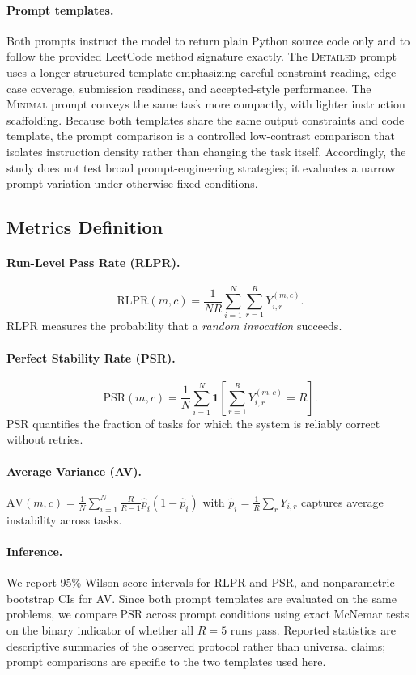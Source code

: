 \documentclass{article}
\begin{document}
\paragraph{Prompt templates.} Both prompts instruct the model to return plain Python source code only and to follow the provided LeetCode method signature exactly. The \textsc{Detailed} prompt uses a longer structured template emphasizing careful constraint reading, edge-case coverage, submission readiness, and accepted-style performance. The \textsc{Minimal} prompt conveys the same task more compactly, with lighter instruction scaffolding. Because both templates share the same output constraints and code template, the prompt comparison is a controlled low-contrast comparison that isolates instruction density rather than changing the task itself. Accordingly, the study does not test broad prompt-engineering strategies; it evaluates a narrow prompt variation under otherwise fixed conditions.

\subsection{Metrics Definition}
\label{sec:metrics}

\paragraph{Run-Level Pass Rate (RLPR).}
$$
\mathrm{RLPR}(m,c)=\frac{1}{NR}\sum_{i=1}^{N}\sum_{r=1}^{R} Y_{i,r}^{(m,c)}.
$$
RLPR measures the probability that a \emph{random invocation} succeeds.

\paragraph{Perfect Stability Rate (PSR).}
$$
\mathrm{PSR}(m,c)=\frac{1}{N}\sum_{i=1}^{N} \mathbf{1}\!\left[\sum_{r=1}^{R} Y_{i,r}^{(m,c)}=R\right].
$$
PSR quantifies the fraction of tasks for which the system is reliably correct without retries.

\paragraph{Average Variance (AV).}
$\mathrm{AV}(m,c)=\frac{1}{N}\sum_{i=1}^{N} \frac{R}{R-1}\hat{p}_i(1-\hat{p}_i)$ with $\hat{p}_i=\frac{1}{R}\sum_r Y_{i,r}$ captures average instability across tasks.

\paragraph{Inference.}
We report 95\% Wilson score intervals for RLPR and PSR, and nonparametric bootstrap CIs for AV. Since both prompt templates are evaluated on the same problems, we compare PSR across prompt conditions using exact McNemar tests on the binary indicator of whether all $R=5$ runs pass. Reported statistics are descriptive summaries of the observed protocol rather than universal claims; prompt comparisons are specific to the two templates used here.
\end{document}
